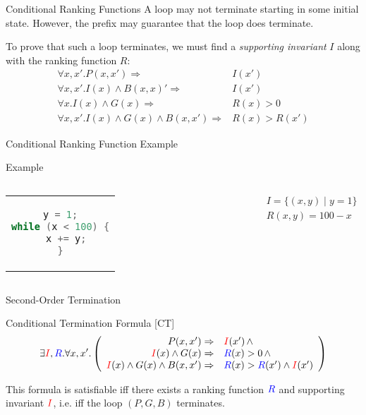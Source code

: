 \documentclass[xcolor=pdftex,t,11pt]{beamer}
\newcommand{\red}[1]{\textcolor{red}{#1}}
\newcommand{\blue}[1]{\textcolor{blue}{#1}}
\begin{document}
\begin{frame}[fragile]{Conditional Ranking Functions}
 A loop may not terminate starting in some initial state.  However, the prefix may guarantee
 that the loop does terminate.

 To prove that such a loop terminates, we must find a \emph{supporting invariant} $I$ along with the
 ranking function $R$:
 \begin{align*}
  \forall x, x' . P(x, x') \Rightarrow & I(x') \\
  \forall x, x' . I(x) \wedge B(x, x)' \Rightarrow & I(x') \\
  \forall x . I(x) \wedge G(x) \Rightarrow & R(x) > 0 \\
  \forall x, x' . I(x) \wedge G(x) \wedge B(x, x') \Rightarrow & R(x) > R(x')
 \end{align*}
\end{frame}

\begin{frame}[fragile]{Conditional Ranking Function Example}
\begin{exampleblock}{Example}
\begin{center}
\begin{columns}[T]
  \begin{tabular}{c}
   \begin{lstlisting}[language=c,basicstyle=\normalsize]
y = 1;
while (x < 100) {
  x += y;
}
   \end{lstlisting}
  \end{tabular}
\begin{gather*}
  I =  \{ (x, y) \mid y = 1 \} \\
  R(x, y) =  100 - x
\end{gather*}
\end{columns}
\end{center}
\end{exampleblock}
\end{frame}

\begin{frame}{Second-Order Termination}

\begin{block}{Conditional Termination Formula [CT]}
 \[
 \exists \red{I}, \blue{R} .  \forall x, x' . \left ( \begin{array}{rl}
   P(x, x') \Rightarrow & \red{I}(x') \, \wedge \\
   \red{I}(x) \wedge G(x) \Rightarrow & \blue{R}(x) > 0 \, \wedge \\
   \red{I}(x) \wedge G(x) \wedge B(x, x') \Rightarrow & \blue{R}(x) > \blue{R}(x') \wedge \red{I}(x')
   \end{array} \right )
 \]
 \end{block}

 \vspace{1em}

This formula is satisfiable iff there exists a ranking function $\blue{R}$ and supporting invariant $\red{I}$,
i.e. iff the loop $(P, G, B)$ terminates.
 
\end{frame}
\end{document}
